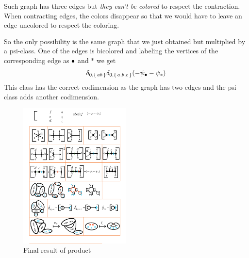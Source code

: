 \documentclass[12pt]{memoir}
\begin{document}
\begin{Ex}
    Such graph has three edges but \emph{they can't be colored} to respect the contraction. When contracting edges, the colors disappear so that we would have to leave an edge uncolored to respect the coloring.\par
    So the only possibility is the same graph that we just obtained but multiplied by a psi-class. One of the edges is bicolored and labeling the vertices of the corresponding edge as $\bullet$ and $\ast$ we get 
    $$\delta_{0,\{\,ab\,\}}\delta_{0,\{\,a,b,c\,\}}(-\psi_\bullet-\psi_\ast)$$
    This class has the correct codimension as the graph has two edges and the psi-class adds another codimension.
 \begin{figure}[h!]
        \centering
        \includegraphics[width=0.5\textwidth, trim= 9cm 13.4cm 5.2cm 11.7cm,clip]{../figs/FigsDNnotability1.pdf}
        \caption{Final result of product}
        \label{fig:three-divisors-5-M06}
    \end{figure}

\end{Ex}
\end{document}
